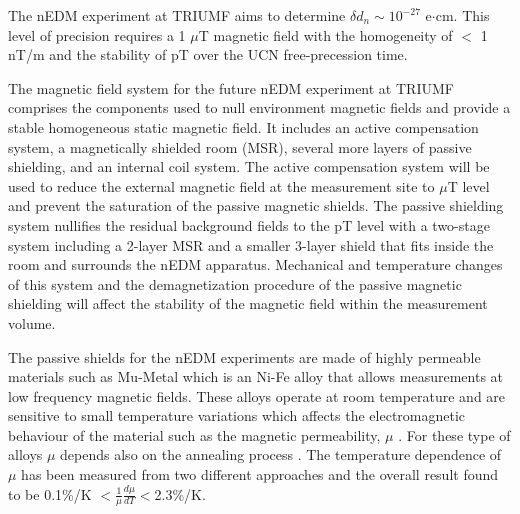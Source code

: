 \documentclass[review]{elsarticle}
\begin{document}
The nEDM experiment at TRIUMF aims to determine $\delta d_n \sim
10^{-27}$ e$\cdot$cm. This level of precision requires a 1 $\mu$T
magnetic field with the homogeneity of $<$ 1 nT/m and the stability of
pT over the UCN free-precession time.

% 
%

The magnetic field system for the future nEDM experiment at TRIUMF comprises the components used to null environment magnetic fields and provide a stable homogeneous static magnetic field. It includes an active compensation system, a magnetically shielded room (MSR), several more layers of passive shielding, and  an internal coil system.
The active compensation system will be used to reduce the external magnetic field at the measurement site to $\mu$T level and prevent the saturation of the passive magnetic shields.
The passive shielding system nullifies the residual background fields to the pT level with a two-stage system including a 2-layer MSR and a smaller 3-layer shield that fits inside the room and surrounds the nEDM apparatus.
Mechanical and temperature changes of this system and the demagnetization procedure of the passive magnetic shielding will affect the stability of the magnetic field within the measurement volume\cite{bib:thiel,bib:altarev2014,bib:altarev2015,bib:voigt}.

%
%

%
%

%
%


The passive shields for the nEDM experiments are made of highly
permeable materials such as Mu-Metal which is an Ni-Fe alloy that
allows measurements at low frequency magnetic fields. These alloys
operate at room temperature and are sensitive to small temperature
variations which affects the electromagnetic behaviour of the material
such as the magnetic permeability, $\mu$ \cite{bib:couderchon,bib:kruppvdm}. For
these type of alloys $\mu$ depends also on the annealing process
\cite{bib:gupta,bib:bozorth}. The temperature dependence of $\mu$ has been
measured from two different approaches and the overall result found to
be 0.1\%/K $<\frac{1}{\mu} \frac{d\mu}{dT}<$2.3\%/K.
\end{document}
